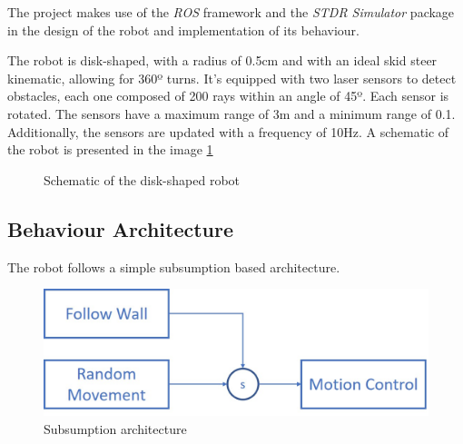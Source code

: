 \documentclass[10pt,journal,compsoc]{IEEEtran}
\begin{document}
The project makes use of the \textit{ROS} framework and the \textit{STDR Simulator} package in the design of the robot and implementation of its behaviour.

The robot is disk-shaped, with a radius of 0.5cm and with an ideal skid steer kinematic, allowing for 360º turns. It’s equipped with two laser sensors to detect obstacles, each one composed of 200 rays within an angle of 45º. Each sensor is rotated. The sensors have a maximum range of 3m and a minimum range of 0.1. Additionally, the sensors are updated with a frequency of 10Hz. A schematic of the robot is presented in the image \ref{fig:robot}


   \begin{figure}[thpb]
      \centering
      \caption{Schematic of the disk-shaped robot}
      \label{fig:robot}
   \end{figure}
   
   
\subsection{Behaviour Architecture}

The robot follows a simple subsumption based architecture.

   \begin{figure}[thpb]
      \centering
      \includegraphics[scale=0.265]{img/architecture.jpg}
      \caption{Subsumption architecture}
      \label{fig:architecture}
   \end{figure}
\end{document}
